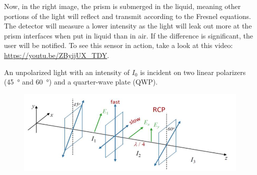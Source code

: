 \documentclass[answers, addpoints]{exam} %
\begin{document}
\begin{questions}
\begin{solution}
	Now, in the right image, the prism is submerged in the liquid, meaning other portions of the light will reflect and transmit according to the Fresnel equations.
	The detector will measure a lower intensity as the light will leak out more at the prism interfaces when put in liquid than in air.
	If the difference is significant, the user will be notified.
	To see this sensor in action, take a look at this video: \url{https://youtu.be/ZByijUX_TDY}.
\end{solution}

\question[15] An unpolarized light with an intensity of $I_0$ is incident on two linear polarizers (\SI{45}{\degree} and \SI{60}{\degree}) and a quarter-wave plate (QWP).
\begin{figure}[H]
	\centering
	\includegraphics[scale=1]{figures/polarizers2}
\end{figure}
\end{questions}
\end{document}
